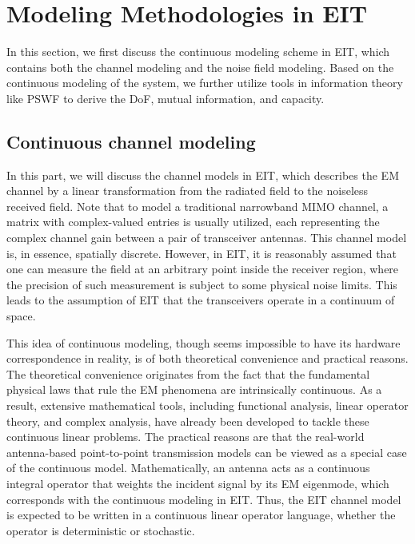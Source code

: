 \documentclass[journal,twocolumn]{IEEEtran}
\begin{document}
\section{Modeling Methodologies in EIT}
In this section, we first discuss the continuous modeling scheme in EIT, which contains both the channel modeling and the noise field modeling. 
Based on the continuous modeling of the system, we further utilize tools in information theory like PSWF to derive the DoF, mutual information, and capacity.

\subsection{Continuous channel modeling}
In this part, we will discuss the channel models in EIT, which describes the EM channel by a linear transformation from the radiated field to the noiseless received field.  
Note that to model a traditional narrowband MIMO channel, a matrix with complex-valued entries is usually utilized, each representing the complex channel gain between a pair of transceiver antennas. 
This channel model is, in essence, spatially discrete. 
However, in EIT, it is reasonably assumed that one can measure the field at an arbitrary point inside the receiver region, where the precision of such measurement is subject to some physical noise limits. This leads to the assumption of EIT that the transceivers operate in a continuum of space.  

This idea of continuous modeling, though seems impossible to have its hardware correspondence in reality, is of both theoretical convenience and practical reasons. 
The theoretical convenience originates from the fact that the fundamental physical laws that rule the EM phenomena are intrinsically continuous. 
As a result, extensive mathematical tools, including functional analysis, linear operator theory, and complex analysis, have already been developed to tackle these continuous linear problems. 
The practical reasons are that the real-world antenna-based point-to-point transmission models can be viewed as a special case of the continuous model. 
Mathematically, an antenna acts as a continuous integral operator that weights the incident signal by its EM eigenmode, which corresponds with the continuous modeling in EIT. 
Thus, the EIT channel model is expected to be written in a continuous linear operator language, whether the operator is deterministic or stochastic.
\end{document}
